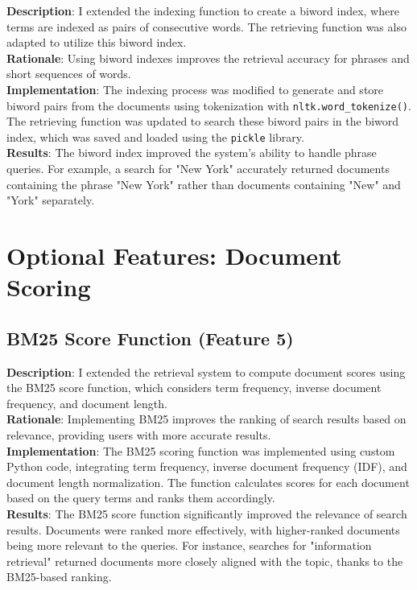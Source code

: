 \documentclass[a4paper,10pt]{article}
\begin{document}
\textbf{Description}: I extended the indexing function to create a biword index, where terms are indexed as pairs of consecutive words. The retrieving function was also adapted to utilize this biword index.\\
\textbf{Rationale}: Using biword indexes improves the retrieval accuracy for phrases and short sequences of words.\\
\textbf{Implementation}: The indexing process was modified to generate and store biword pairs from the documents using tokenization with \texttt{nltk.word\_tokenize()}. The retrieving function was updated to search these biword pairs in the biword index, which was saved and loaded using the \texttt{pickle} library.\\
\textbf{Results}: The biword index improved the system’s ability to handle phrase queries. For example, a search for "New York" accurately returned documents containing the phrase "New York" rather than documents containing "New" and "York" separately.

\section{Optional Features: Document Scoring}

\subsection{BM25 Score Function (Feature 5)}

\textbf{Description}: I extended the retrieval system to compute document scores using the BM25 score function, which considers term frequency, inverse document frequency, and document length.\\
\textbf{Rationale}: Implementing BM25 improves the ranking of search results based on relevance, providing users with more accurate results.\\
\textbf{Implementation}: The BM25 scoring function was implemented using custom Python code, integrating term frequency, inverse document frequency (IDF), and document length normalization. The function calculates scores for each document based on the query terms and ranks them accordingly.\\
\textbf{Results}: The BM25 score function significantly improved the relevance of search results. Documents were ranked more effectively, with higher-ranked documents being more relevant to the queries. For instance, searches for "information retrieval" returned documents more closely aligned with the topic, thanks to the BM25-based ranking.
\end{document}
